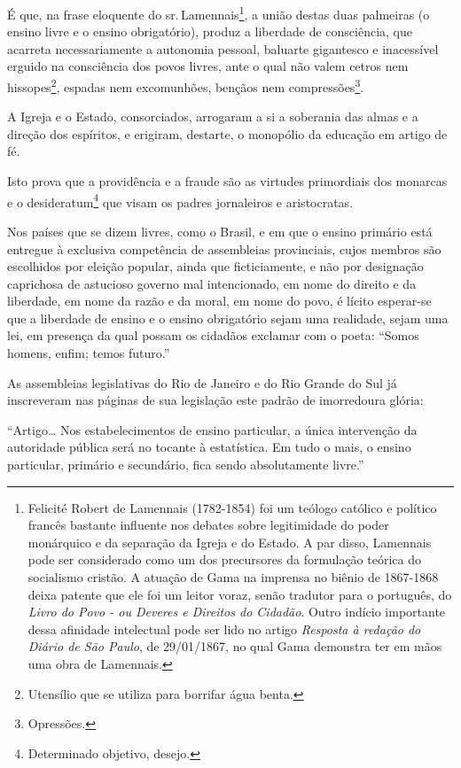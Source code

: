 É que, na frase eloquente do sr.\,Lamennais\footnote{Felicité Robert de
  Lamennais (1782-1854) foi um teólogo católico e político francês
  bastante influente nos debates sobre legitimidade do poder monárquico
  e da separação da Igreja e do Estado. A par disso, Lamennais pode ser
  considerado como um dos precursores da formulação teórica do
  socialismo cristão. A atuação de Gama na imprensa no biênio de
  1867-1868 deixa patente que ele foi um leitor voraz, senão tradutor
  para o português, do \emph{Livro do Povo - ou Deveres e Direitos do
  Cidadão}. Outro indício importante dessa afinidade intelectual pode
  ser lido no artigo \emph{Resposta à redação do Diário de São Paulo}, de
  29/01/1867, no qual Gama demonstra ter em mãos uma obra de Lamennais.},
a união destas duas palmeiras (o ensino livre e o ensino obrigatório),
produz a liberdade de consciência, que acarreta necessariamente a
autonomia pessoal, baluarte gigantesco e inacessível erguido na
consciência dos povos livres, ante o qual não valem cetros nem
hissopes\footnote{Utensílio que se utiliza para borrifar água benta.},
espadas nem excomunhões, bençãos nem compressões\footnote{Opressões.}.

A Igreja e o Estado, consorciados, arrogaram a si a soberania das almas
e a direção dos espíritos, e erigiram, destarte, o monopólio da educação
em artigo de fé.

Isto prova que a providência e a fraude são as virtudes primordiais dos
monarcas e o desideratum\footnote{Determinado objetivo, desejo.} que
visam os padres jornaleiros e aristocratas.

Nos países que se dizem livres, como o Brasil, e em que o ensino
primário está entregue à exclusiva competência de assembleias
provinciais, cujos membros são escolhidos por eleição popular, ainda que
ficticiamente, e não por designação caprichosa de astucioso governo mal
intencionado, em nome do direito e da liberdade, em nome da razão e da
moral, em nome do povo, é lícito esperar-se que a liberdade de ensino e
o ensino obrigatório sejam uma realidade, sejam uma lei, em presença da
qual possam os cidadãos exclamar com o poeta: ``Somos homens, enfim;
temos futuro.''

As assembleias legislativas do Rio de Janeiro e do Rio Grande do Sul já
inscreveram nas páginas de sua legislação este padrão de imorredoura
glória:

``Artigo\ldots{} Nos estabelecimentos de ensino particular, a única
intervenção da autoridade pública será no tocante à estatística. Em tudo
o mais, o ensino particular, primário e secundário, fica sendo
absolutamente livre.''

